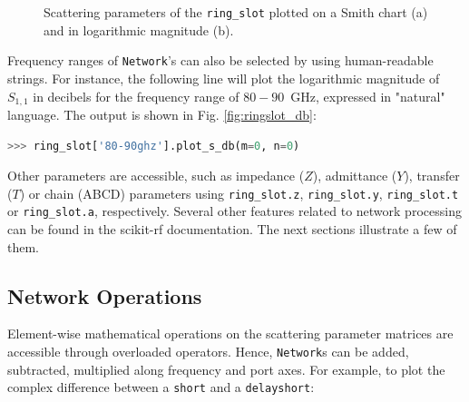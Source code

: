 \documentclass[10pt, letterpaper]{scrartcl}
\newcommand{\skrf}{{s}cikit-rf\xspace}
\begin{document}
\begin{figure}
	\centering
	\caption{Scattering parameters of the \texttt{ring\_slot} plotted on a Smith chart (a) and in logarithmic magnitude (b).}
	\label{fig:ringslot}
\end{figure}

Frequency ranges of \texttt{Network}'s can also be selected by using human-readable strings. For instance, the following line will plot the logarithmic magnitude of $S_{1,1}$ in decibels for the frequency range of $80-90$~GHz, expressed in "natural" language. The output is shown in Fig. \ref{fig:ringslot_db}:

\begin{lstlisting}[language=Python]
>>> ring_slot['80-90ghz'].plot_s_db(m=0, n=0)
\end{lstlisting}

Other parameters are accessible, such as impedance ($Z$), admittance ($Y$), transfer ($T$) or chain (ABCD) parameters using \texttt{ring\_slot.z}, \texttt{ring\_slot.y}, \texttt{ring\_slot.t} or \texttt{ring\_slot.a}, respectively. Several other features related to network processing can be found in the \skrf{} documentation. The next sections illustrate a few of them. 

\subsection{Network Operations}
Element-wise mathematical operations on the scattering parameter matrices are accessible through overloaded operators. Hence, \texttt{Network}s can be added, subtracted, multiplied along frequency and port axes. For example, to plot the complex difference between a \texttt{short} and a \texttt{delayshort}:
\end{document}
